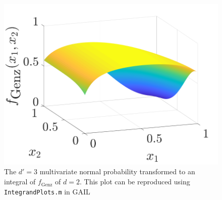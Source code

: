 \documentclass[twocolumn]{svjour3}          %
\newcommand{\code}[1]{\texttt{#1}}
\begin{document}
\begin{figure}
	\captionsetup[subfigure]{labelformat=empty}
	\centering
		\includegraphics[width=0.7\linewidth]{GenzFunc_varTx_none}
	\caption{The $d'=3$ multivariate normal probability transformed to an integral of $f_{\text{Genz}}$ of $d=2$. This plot can be reproduced using \code{IntegrandPlots.m} in GAIL}
	\label{fig:MVN_Genz}
\end{figure}
\end{document}
